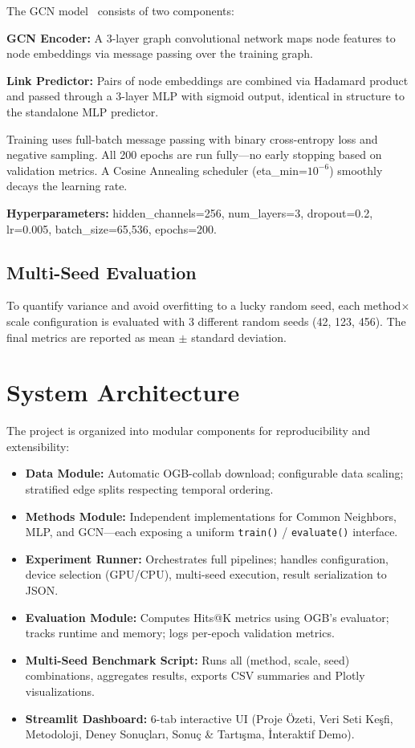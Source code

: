 \documentclass[12pt,a4paper]{article}
\begin{document}
The GCN model~\cite{kipf2017} consists of two components:

\textbf{GCN Encoder:} A 3-layer graph convolutional network maps node features to node embeddings via message passing over the training graph.

\textbf{Link Predictor:} Pairs of node embeddings are combined via Hadamard product and passed through a 3-layer MLP with sigmoid output, identical in structure to the standalone MLP predictor.

Training uses full-batch message passing with binary cross-entropy loss and negative sampling. All 200 epochs are run fully—no early stopping based on validation metrics. A Cosine Annealing scheduler (eta\_min=$10^{-6}$) smoothly decays the learning rate.

\textbf{Hyperparameters:} hidden\_channels=256, num\_layers=3, dropout=0.2, lr=0.005, batch\_size=65,536, epochs=200.

\subsection{Multi-Seed Evaluation}

To quantify variance and avoid overfitting to a lucky random seed, each method$\times$scale configuration is evaluated with 3 different random seeds (42, 123, 456). The final metrics are reported as mean $\pm$ standard deviation.

\section{System Architecture}

The project is organized into modular components for reproducibility and extensibility:

\begin{itemize}[nosep]
    \item \textbf{Data Module:} Automatic OGB-collab download; configurable data scaling; stratified edge splits respecting temporal ordering.
    \item \textbf{Methods Module:} Independent implementations for Common Neighbors, MLP, and GCN—each exposing a uniform \texttt{train()} / \texttt{evaluate()} interface.
    \item \textbf{Experiment Runner:} Orchestrates full pipelines; handles configuration, device selection (GPU/CPU), multi-seed execution, result serialization to JSON.
    \item \textbf{Evaluation Module:} Computes Hits@K metrics using OGB's evaluator; tracks runtime and memory; logs per-epoch validation metrics.
    \item \textbf{Multi-Seed Benchmark Script:} Runs all (method, scale, seed) combinations, aggregates results, exports CSV summaries and Plotly visualizations.
    \item \textbf{Streamlit Dashboard:} 6-tab interactive UI (Proje Özeti, Veri Seti Keşfi, Metodoloji, Deney Sonuçları, Sonuç \& Tartışma, İnteraktif Demo).
\end{itemize}
\end{document}
